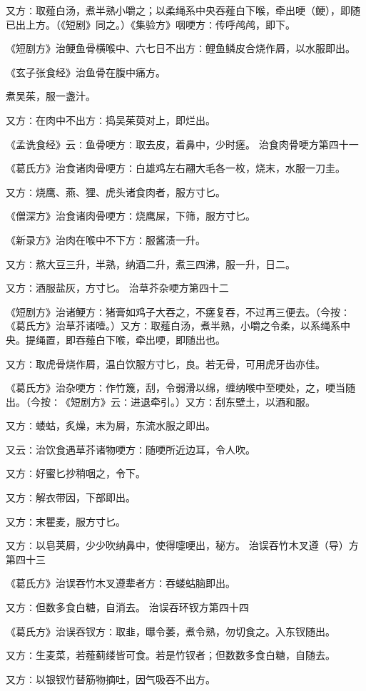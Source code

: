 \documentclass[a4paper,12pt,UTF8,twoside]{ctexbook}
\begin{document}
又方∶取薤白汤，煮半熟小嚼之；以柔绳系中央吞薤白下喉，牵出哽（鲠），即随已出上方。（《短剧》同之。）《集验方》咽哽方∶传呼鸬鸬，即下。

《短剧方》治鲠鱼骨横喉中、六七日不出方∶鲤鱼鳞皮合烧作屑，以水服即出。

《玄子张食经》治鱼骨在腹中痛方。

煮吴茱，服一盏汁。

又方∶在肉中不出方∶捣吴茱萸对上，即烂出。

《孟诜食经》云∶鱼骨哽方∶取去皮，着鼻中，少时瘥。
治食肉骨哽方第四十一

《葛氏方》治食诸肉骨哽方∶白雄鸡左右翮大毛各一枚，烧末，水服一刀圭。

又方∶烧鹰、燕、狸、虎头诸食肉者，服方寸匕。

《僧深方》治食诸肉骨哽方∶烧鹰屎，下筛，服方寸匕。

《新录方》治肉在喉中不下方∶服酱渍一升。

又方∶熬大豆三升，半熟，纳酒二升，煮三四沸，服一升，日二。

又方∶酒服盐灰，方寸匕。
治草芥杂哽方第四十二

《短剧方》治诸鲠方∶猪膏如鸡子大吞之，不瘥复吞，不过再三便去。（今按∶《葛氏方》治草芥诸噎。）又方∶取薤白汤，煮半熟，小嚼之令柔，以系绳系中央。提绳置，即吞薤白下喉，牵出哽，即随出也。

又方∶取虎骨烧作屑，温白饮服方寸匕，良。若无骨，可用虎牙齿亦佳。

《葛氏方》治杂哽方∶作竹篾，刮，令弱滑以绵，缠纳喉中至哽处，之，哽当随出。（今按∶《短剧方》云∶进退牵引。）又方∶刮东壁土，以酒和服。

又方∶蝼蛄，炙燥，末为屑，东流水服之即出。

又云∶治饮食遇草芥诸物哽方∶随哽所近边耳，令人吹。

又方∶好蜜匕抄稍咽之，令下。

又方∶解衣带因，下部即出。

又方∶末瞿麦，服方寸匕。

又方∶以皂荚屑，少少吹纳鼻中，使得嚏哽出，秘方。
治误吞竹木叉遵（导）方第四十三

《葛氏方》治误吞竹木叉遵辈者方∶吞蝼蛄脑即出。

又方∶但数多食白糖，自消去。
治误吞环钗方第四十四

《葛氏方》治误吞钗方∶取韭，曝令萎，煮令熟，勿切食之。入东钗随出。

又方∶生麦菜，若薤蓟缕皆可食。若是竹钗者；但数数多食白糖，自随去。

又方∶以银钗竹替筋物摘吐，因气吸吞不出方。
\end{document}
